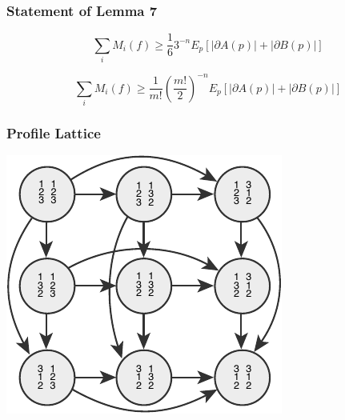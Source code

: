 \documentclass[aspectratio=169]{beamer}
\begin{document}
		\begin{frame}
			\frametitle{Statement of Lemma 7}

			\begin{lemma}
				\[
					\sum_i M_i(f) \ge \frac{1}{6} 3^{-n} E_p \left[|\partial A(p)| + |\partial B(p)| \right]
				\]
			\end{lemma}

			\begin{lemma}
				\[
					\sum_i M_i(f) \ge \frac{1}{m!} \left(\frac{m!}{2}\right)^{-n} E_p \left[|\partial A(p)| + |\partial B(p)| \right]
				\]
			\end{lemma}
		\end{frame}

		\begin{frame}
			\frametitle{Profile Lattice}

			\centerline{\includegraphics[height=0.7\paperheight, keepaspectratio]{../figures/profile_lattice.pdf}}
		\end{frame}
\end{document}
